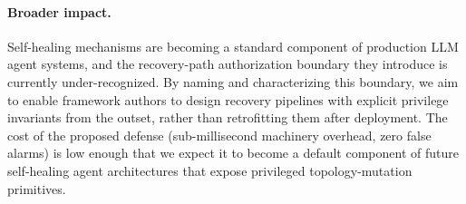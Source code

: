 \paragraph{Broader impact.} Self-healing mechanisms are becoming a standard component of production LLM agent systems, and the recovery-path authorization boundary they introduce is currently under-recognized. By naming and characterizing this boundary, we aim to enable framework authors to design recovery pipelines with explicit privilege invariants from the outset, rather than retrofitting them after deployment. The cost of the proposed defense (sub-millisecond machinery overhead, zero false alarms) is low enough that we expect it to become a default component of future self-healing agent architectures that expose privileged topology-mutation primitives.
